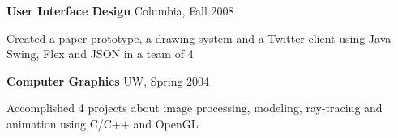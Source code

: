 \documentclass[margin,line]{resume}
\begin{document}
\begin{resume}
    \textbf{User Interface Design} \hfill Columbia, Fall 2008  \vspace{-3mm}\\\vspace{-1mm}%
      \begin{list2}
      \item Created a paper prototype, a drawing system and a Twitter client using Java Swing, Flex and JSON in a team of 4 
      \end{list2}      

    \textbf{Computer Graphics} \hfill UW, Spring 2004  \vspace{-3mm}\\\vspace{-1mm}%
      \begin{list2}
      \item Accomplished 4 projects about image processing, modeling, ray-tracing and animation using C/C++ and OpenGL       
      \end{list2}

\end{resume}
\end{document}
